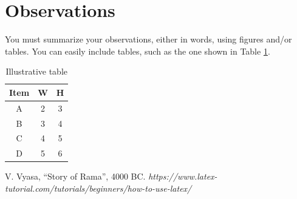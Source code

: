 \documentclass[12pt]{article}
\begin{document}
\section{Observations}

You must summarize your observations, either in words, using
figures and/or tables.
%
%
You can easily include tables, such as the one shown in  Table \ref{table:demotable}.
\begin{table}
\centering  %
\begin{tabular}{|c | c c|} %
\hline  %
Item & W & H \\  %
\hline  %
A    & 2 & 3 \\  %
B    & 3 & 4 \\  %
C    & 4 & 5 \\  %
D    & 5 & 6 \\  %
\hline	%
\end{tabular}
\caption{Illustrative table}
\label{table:demotable}
\end{table}


%
% 
\begin{thebibliography}{99}
V. Vyasa, ``Story of Rama'', 4000 BC.
%
%
{\em https://www.latex-tutorial.com/tutorials/beginners/how-to-use-latex/}

\end{thebibliography}
\end{document}
